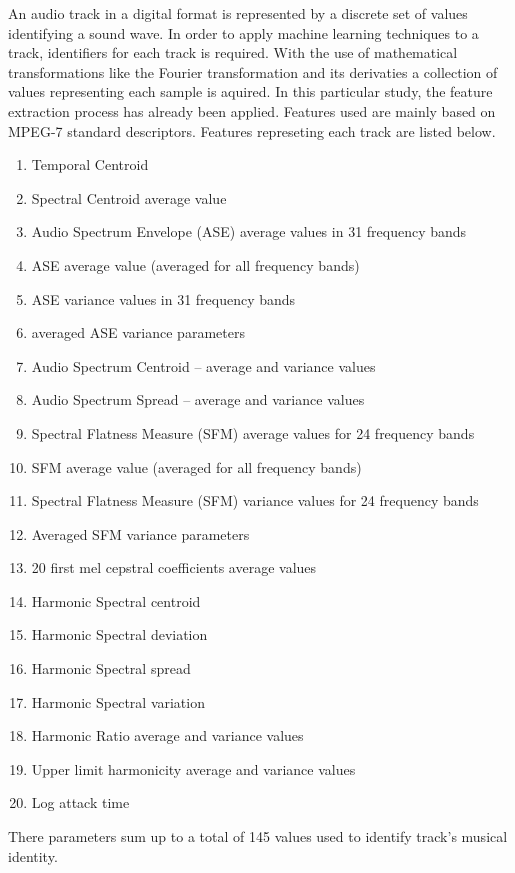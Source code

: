 An audio track in a digital format is represented by a discrete set of values identifying a sound wave. In order to apply machine learning techniques to a track, identifiers for each track is required. With the use of mathematical transformations like the Fourier transformation and its derivaties a collection of values representing each sample is aquired. In this particular study, the feature extraction process has already been applied. Features used are mainly based on MPEG-7 standard descriptors. Features represeting each track are listed below.

\begin{enumerate}
\item Temporal Centroid 
\item Spectral Centroid average value 
\item Audio Spectrum Envelope (ASE) average values in 31 frequency bands
\item ASE average value (averaged for all frequency bands)
\item ASE variance values in 31 frequency bands
\item averaged ASE variance parameters
\item Audio Spectrum Centroid – average and variance values
\item Audio Spectrum Spread – average and variance values
\item Spectral Flatness Measure (SFM) average values for 24 frequency bands
\item SFM average value (averaged for all frequency bands)
\item Spectral Flatness Measure (SFM) variance values for 24 frequency bands
\item Averaged SFM variance parameters
\item 20 first mel cepstral coefficients average values 
\item Harmonic Spectral centroid
\item Harmonic Spectral deviation
\item Harmonic Spectral spread
\item Harmonic Spectral variation
\item Harmonic Ratio average and variance values
\item Upper limit harmonicity average and variance values
\item Log attack time
\end{enumerate}

There parameters sum up to a total of 145 values used to identify track's musical identity. 